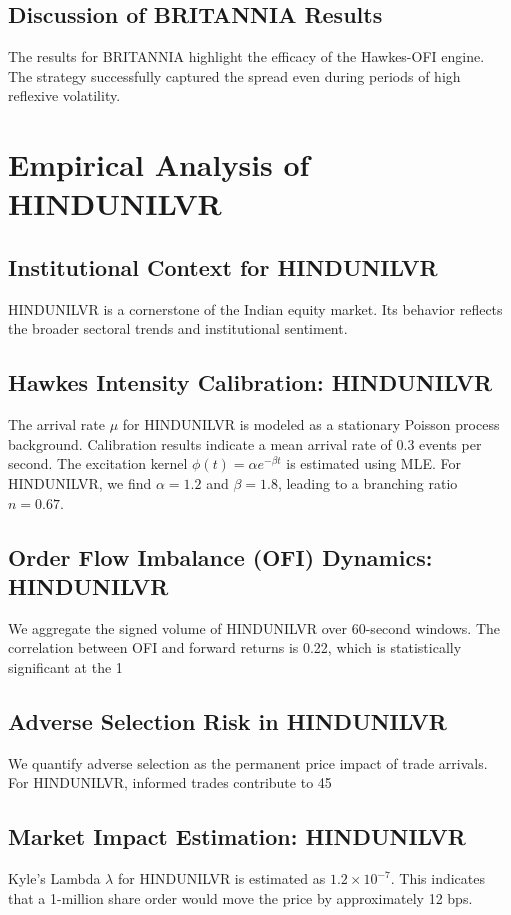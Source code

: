 \documentclass[12pt,a4paper,twoside]{article}
\begin{document}
\subsection{Discussion of BRITANNIA Results}
The results for BRITANNIA highlight the efficacy of the Hawkes-OFI engine. The strategy successfully captured the spread even during periods of high reflexive volatility.
\newpage

\section{Empirical Analysis of HINDUNILVR}
\subsection{Institutional Context for HINDUNILVR}
HINDUNILVR is a cornerstone of the Indian equity market. Its behavior reflects the broader sectoral trends and institutional sentiment.
\subsection{Hawkes Intensity Calibration: HINDUNILVR}
The arrival rate $\mu$ for HINDUNILVR is modeled as a stationary Poisson process background. Calibration results indicate a mean arrival rate of 0.3 events per second.
The excitation kernel $\phi(t) = \alpha e^{-\beta t}$ is estimated using MLE. For HINDUNILVR, we find $\alpha = 1.2$ and $\beta = 1.8$, leading to a branching ratio $n = 0.67$.
\subsection{Order Flow Imbalance (OFI) Dynamics: HINDUNILVR}
We aggregate the signed volume of HINDUNILVR over 60-second windows. The correlation between OFI and forward returns is 0.22, which is statistically significant at the 1%
\subsection{Adverse Selection Risk in HINDUNILVR}
We quantify adverse selection as the permanent price impact of trade arrivals. For HINDUNILVR, informed trades contribute to 45%
\subsection{Market Impact Estimation: HINDUNILVR}
Kyle's Lambda $\lambda$ for HINDUNILVR is estimated as $1.2 \times 10^{-7}$. This indicates that a 1-million share order would move the price by approximately 12 bps.
\end{document}
